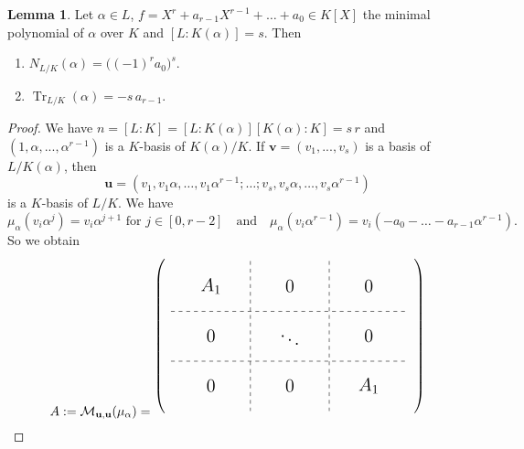 \documentclass[12pt,a4paper]{report}
\theoremstyle{definition}
\newtheorem{lemma}[theorem]{Lemma}
\theoremstyle{num.custom-title}
\DeclareMathOperator{\Tr}{Tr}
\newcommand{\M}{\mathcal{M}}
\renewcommand{\u}{\mathbf{u}}
\begin{document}
\begin{lemma}\label{lemma-norm-trace_min-poly}
Let $\alpha \in L$, $f= X^r + a_{r-1} X^{r-1} + \ldots + a_0 \in K[X]$ the minimal polynomial of $\alpha$ over $K$ and $[L:K(\alpha)]=s$. Then
\begin{enumerate}
\item $N_{L/K}(\alpha) = \big( (-1)^r a_0 \big)^s$.
\item $\Tr_{L/K}(\alpha) = -s \, a_{r-1}$.
\end{enumerate}
\begin{proof}
We have $n=[L:K]=[L:K(\alpha)][K(\alpha):K]=s \, r$ and $(1,\alpha,...,\alpha^{r-1})$ is a $K$-basis of $K(\alpha)/K$. If $\mathbf{v}=(v_1,...,v_s)$ is a basis of $L/K(\alpha)$, then 
\[
\u = (v_1,v_1 \alpha, \ldots , v_1 \alpha^{r-1}; \ldots ; v_s, v_s \alpha, \ldots ,v_s \alpha^{r-1})
\]
is a $K$-basis of $L/K$. We have
\[
\mu_\alpha (v_i \alpha^j) = v_i \alpha^{j+1} \text{ for } j \in [0,r-2] \quad \text{and} \quad \mu_\alpha (v_i \alpha^{r-1}) = v_i (-a_0 - \ldots - a_{r-1} \alpha^{r-1}).
\]
So we obtain
\[
A := \M_{\u,\u}(\mu_\alpha) =
\begin{tikzpicture}[
style1/.style={
  matrix of math nodes,
  every node/.append style={text width=#1,align=center,minimum height=3ex},
  nodes in empty cells,
  left delimiter=(,
  right delimiter=),
  }
]
\matrix[style1=0.85cm] (1mat)
{
  & & & & &  \\
  & & & & & \\
  & & & & & \\
  & & & & & \\
  & & & & & \\
  & & & & & \\
  & & & & & \\
  & & & & & \\
  & & & & & \\
};
\draw[dashed]
  (1mat-3-1.south west) -- (1mat-3-6.south east);
\draw[dashed]
  (1mat-6-1.south west) -- (1mat-6-6.south east);
\draw[dashed]
  (1mat-1-4.north east) -- (1mat-9-4.south east);
\draw[dashed]
  (1mat-1-2.north east) -- (1mat-9-2.south east);
\node[font=\Large] 
  at (1mat-2-1.east) {$A_1$};
\node[font=\Large] 
  at (1mat-2-5.east) {$0$};
  \node[font=\Large] 
  at (1mat-5-3.east) {$\ddots$};
\node[font=\Large] 
  at (1mat-5-5.east) {$0$};
\node[font=\Large] 
  at (1mat-8-5.east) {$A_1$};
\node[font=\Large] 
  at (1mat-8-1.east) {$0$};
\node[font=\Large] 
  at (1mat-8-3.east) {$0$};
\node[font=\Large] 
  at (1mat-2-3.east) {$0$};
\node[font=\Large] 
  at (1mat-5-1.east) {$0$};
\end{tikzpicture}
\]
\end{proof}
\end{lemma}
\end{document}
